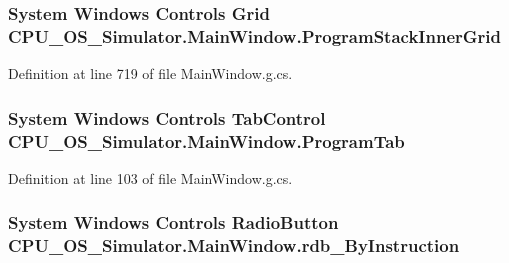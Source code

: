 \subsubsection[{Program\+Stack\+Inner\+Grid}]{\setlength{\rightskip}{0pt plus 5cm}System Windows Controls Grid C\+P\+U\+\_\+\+O\+S\+\_\+\+Simulator.\+Main\+Window.\+Program\+Stack\+Inner\+Grid\hspace{0.3cm}{\ttfamily [package]}}\label{class_c_p_u___o_s___simulator_1_1_main_window_a8c373866c86f6be0e7ef487a5ccb8c3c}


Definition at line 719 of file Main\+Window.\+g.\+cs.

\hypertarget{class_c_p_u___o_s___simulator_1_1_main_window_a615ea960969aa9a61afdaef8cf039348}{}
\subsubsection[{Program\+Tab}]{\setlength{\rightskip}{0pt plus 5cm}System Windows Controls Tab\+Control C\+P\+U\+\_\+\+O\+S\+\_\+\+Simulator.\+Main\+Window.\+Program\+Tab\hspace{0.3cm}{\ttfamily [package]}}\label{class_c_p_u___o_s___simulator_1_1_main_window_a615ea960969aa9a61afdaef8cf039348}


Definition at line 103 of file Main\+Window.\+g.\+cs.

\hypertarget{class_c_p_u___o_s___simulator_1_1_main_window_acba6218f7f716645443533815c6bd7a3}{}
\subsubsection[{rdb\+\_\+\+By\+Instruction}]{\setlength{\rightskip}{0pt plus 5cm}System Windows Controls Radio\+Button C\+P\+U\+\_\+\+O\+S\+\_\+\+Simulator.\+Main\+Window.\+rdb\+\_\+\+By\+Instruction\hspace{0.3cm}{\ttfamily [package]}}\label{class_c_p_u___o_s___simulator_1_1_main_window_acba6218f7f716645443533815c6bd7a3}


